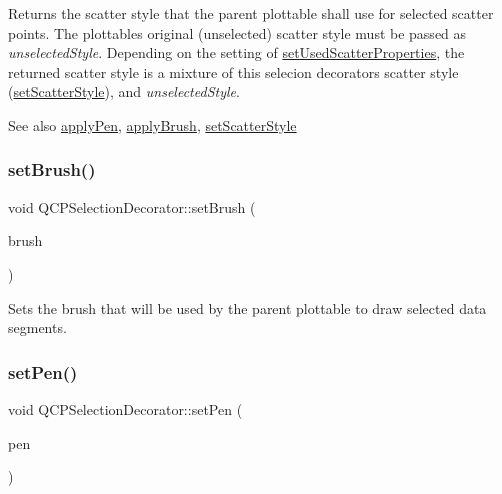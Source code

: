 Returns the scatter style that the parent plottable shall use for selected scatter points. The plottable\textquotesingle{}s original (unselected) scatter style must be passed as {\itshape unselected\+Style}. Depending on the setting of \hyperlink{class_q_c_p_selection_decorator_a808c1607cd4e83869c04986e332455c0}{set\+Used\+Scatter\+Properties}, the returned scatter style is a mixture of this selecion decorator\textquotesingle{}s scatter style (\hyperlink{class_q_c_p_selection_decorator_ab403a613289714ff4fd4a0c0371ab116}{set\+Scatter\+Style}), and {\itshape unselected\+Style}.

\begin{DoxySeeAlso}{See also}
\hyperlink{class_q_c_p_selection_decorator_a75098893f7d08660ea449206810679d7}{apply\+Pen}, \hyperlink{class_q_c_p_selection_decorator_a225544527d51b49546b70d0e6d655a34}{apply\+Brush}, \hyperlink{class_q_c_p_selection_decorator_ab403a613289714ff4fd4a0c0371ab116}{set\+Scatter\+Style} 
\end{DoxySeeAlso}
\mbox{\label{class_q_c_p_selection_decorator_aa74b626be518ea17055f918d423c8c2d}} 
\subsubsection{\texorpdfstring{set\+Brush()}{setBrush()}}
{\footnotesize\ttfamily void Q\+C\+P\+Selection\+Decorator\+::set\+Brush (\begin{DoxyParamCaption}\item[{const Q\+Brush \&}]{brush }\end{DoxyParamCaption})}

Sets the brush that will be used by the parent plottable to draw selected data segments. \mbox{\label{class_q_c_p_selection_decorator_ac2c8192e1e294aa3a4a7f32a859e3d76}} 
\subsubsection{\texorpdfstring{set\+Pen()}{setPen()}}
{\footnotesize\ttfamily void Q\+C\+P\+Selection\+Decorator\+::set\+Pen (\begin{DoxyParamCaption}\item[{const Q\+Pen \&}]{pen }\end{DoxyParamCaption})}

